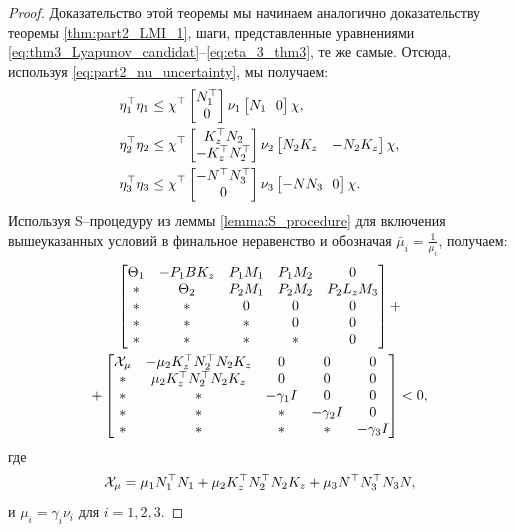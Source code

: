 \begin{proof}
	Доказательство этой теоремы мы начинаем аналогично доказательству теоремы \ref{thm:part2_LMI_1}, шаги, представленные уравнениями \eqref{eq:thm3_Lyapunov_candidat}--\eqref{eq:eta_3_thm3}, те же самые. Отсюда, используя \eqref{eq:part2_nu_uncertainty}, мы получаем:
	\begin{align}
		\label{eq:eta1_bound}
		\eta_1^\top\eta_1 &\leq \chi^\top \begin{bmatrix}
			{N}_1^\top \\ 0  
		\end{bmatrix}\nu_1\begin{bmatrix}
			{N}_1 \ \ 0  
		\end{bmatrix} \chi,
		\\
		\eta_2^\top\eta_2 &\leq \chi^\top \begin{bmatrix}
			{K}_z^\top{N}_2 \\ -{K}_z^\top{N}_2^\top  
		\end{bmatrix}\nu_2\begin{bmatrix}
			{N}_2{K}_z & -{N}_2{K}_z
		\end{bmatrix} \chi,
		\\
		\eta_3^\top\eta_3 &\leq \chi^\top \begin{bmatrix}
			-{N}^\top{N}_3^\top \\ 0  
		\end{bmatrix}\nu_3\begin{bmatrix}
			-{N}{N}_3 \ \ 0  
		\end{bmatrix} \chi.
	\end{align}
	Используя S--процедуру из леммы \ref{lemma:S_procedure} для включения вышеуказанных условий в финальное неравенство и обозначая $\bar{\mu}_i=\frac{1}{\mu_i}$, получаем:
	\begin{multline}
		\begin{bmatrix}
			{\Theta}_1 & -{P}_1{B}{K}_z & {P}_1{M}_1 & {P}_1{M}_2 &0 \\
			* &    {\Theta}_2 & {P}_2{M}_1 & {P}_2{M}_2 & {P}_2{L}_z{M}_3\\
			* & * & 0 & 0&0\\
			* & * & * & 0&0 \\
			* & * & * & *&0
		\end{bmatrix} + \\
		+ \begin{bmatrix}
			\mathcal{X}_{\mu}& -\mu_2{K}_z^\top{N}_2^\top{N}_2{K}_z &0 &0 & 0\\
			*&\mu_2{K}_z^\top{N}_2^\top{N}_2{K}_z&0&0&0\\
			*&*&-\gamma_1{I}&0&0\\
			*&*&*&-\gamma_2{I}&0\\
			*&*&*&*&-\gamma_3{I}\\
		\end{bmatrix} 
		<0,
	\end{multline}
	где
	\begin{equation}
		\mathcal{X}_{\mu}=\mu_1{N}_1^\top{N}_1 +\mu_2{K}_z^\top{N}_2^\top{N}_2{K}_z+\mu_3{N}^\top{N}_3^\top{N}_3{N},
	\end{equation}
	и $\mu_i=\gamma_i\nu_i$ для $i=1,2,3$.
	

\end{proof}

